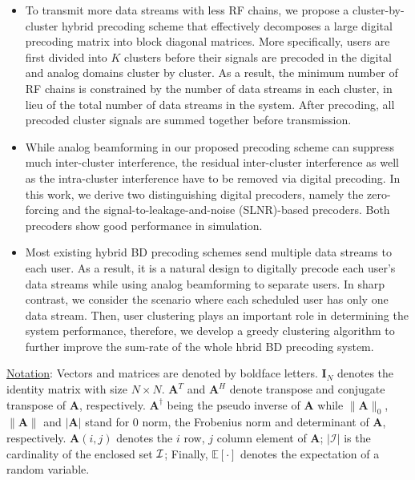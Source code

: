 \documentclass[conference]{IEEEtran}
\begin{document}
\begin{itemize}[leftmargin=*]
\item To transmit more data streams with less RF chains, we propose a cluster-by-cluster hybrid precoding scheme that effectively decomposes a large digital precoding matrix into block diagonal matrices. More specifically, users are first divided into $K$ clusters before their signals are precoded in the digital and analog domains cluster by cluster. As a result, the minimum number of RF chains is constrained by the number of data streams in each cluster, in lieu of the total number of data streams in the system. After precoding, all precoded cluster signals are summed together before transmission.\
\item While analog beamforming in our proposed precoding scheme can suppress much inter-cluster interference, the residual inter-cluster interference as well as the intra-cluster interference have to be removed via digital precoding. In this work, we derive two distinguishing digital precoders, namely the zero-forcing and the signal-to-leakage-and-noise (SLNR)-based precoders. Both precoders show good performance in simulation.
\item Most existing hybrid BD precoding schemes send multiple data streams to each user. As a result, it is a natural design to digitally precode each user's data streams while using analog beamforming to separate users. In sharp contrast, we consider the scenario where each scheduled user has only one data stream. Then, user clustering plays an important role in determining the system performance, therefore, we develop a greedy clustering algorithm to further improve the sum-rate of the whole hbrid BD precoding system.
\end{itemize}


\underline{Notation}: Vectors and matrices are denoted by boldface letters. $\bm{I}_N$ denotes the identity matrix with size $N\times N$. ${\bm A}^T$ and ${\bm A}^H$ denote transpose and conjugate transpose of ${\bm A}$, respectively. $\bm{A}^\dagger$ being the pseudo inverse of $\bm{A}$ while $\|\bm{A}\|_0$, $\|\bm{A}\| $ and $|\bm{A}|$ stand for $0$ norm, the Frobenius norm and determinant of ${\bm A}$, respectively. $\bm{A}(i,j)$ denotes the $i$ row, $j$ column element of ${\bm A}$; $|\mathcal{I}|$ is the cardinality of the enclosed set ${\cal I}$; Finally, $\mathbb{E}[\cdot] $ denotes the expectation of a random variable.
\end{document}
